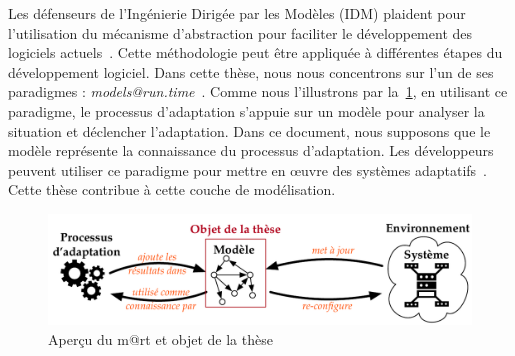Les défenseurs de l'Ingénierie Dirigée par les Modèles (IDM) plaident pour l'utilisation du mécanisme d'abstraction pour faciliter le développement des logiciels actuels~\cite{DBLP:journals/computer/Schmidt06, DBLP:conf/ifm/Kent02, DBLP:series/synthesis/2017Brambilla}. 
Cette méthodologie peut être appliquée à différentes étapes du développement logiciel. 
Dans cette thèse, nous nous concentrons sur l'un de ses paradigmes : \textit{models@run.time}~\cite{DBLP:journals/computer/BlairBF09, DBLP:journals/computer/MorinBJFS09}. 
Comme nous l'illustrons par la~\cref{fig:french:context:m@rt}, en utilisant ce paradigme, le processus d'adaptation s'appuie sur un modèle pour analyser la situation et déclencher l'adaptation. 
Dans ce document, nous supposons que le modèle représente la connaissance du processus d'adaptation. 
Les développeurs peuvent utiliser ce paradigme pour mettre en œuvre des systèmes adaptatifs~\cite{DBLP:journals/computer/MorinBJFS09, DBLP:conf/smartgridsec/0001FKNT14}.
Cette thèse contribue à cette couche de modélisation.


\begin{figure}
	\centering
	\includegraphics[width=.9\linewidth]{img/apdx-french/context/mart-focus}
	\caption{Aperçu du \gls{m@rt} et objet de la thèse}
	\label{fig:french:context:m@rt}
\end{figure}
